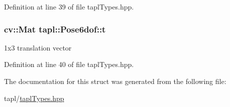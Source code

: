Definition at line 39 of file tapl\+Types.\+hpp.

\subsubsection[{\texorpdfstring{t}{t}}]{\setlength{\rightskip}{0pt plus 5cm}cv\+::\+Mat tapl\+::\+Pose6dof\+::t}\hypertarget{structtapl_1_1Pose6dof_aaac0151b90bd28d462e400e5b5dbefcb}{}\label{structtapl_1_1Pose6dof_aaac0151b90bd28d462e400e5b5dbefcb}
1x3 translation vector 

Definition at line 40 of file tapl\+Types.\+hpp.



The documentation for this struct was generated from the following file\+:\begin{DoxyCompactItemize}
\item 
tapl/\hyperlink{taplTypes_8hpp}{tapl\+Types.\+hpp}\end{DoxyCompactItemize}
